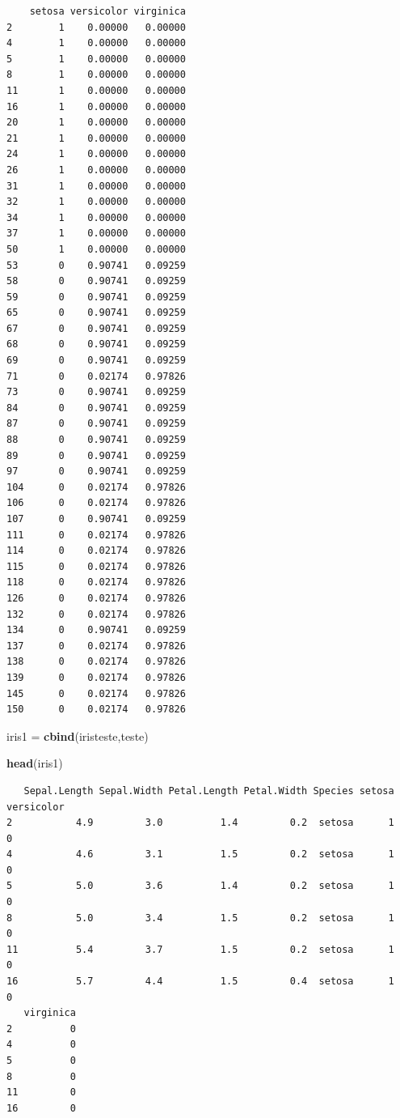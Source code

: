 \documentclass[12pt,brazil,oneside]{book}
\newenvironment{Shaded}{\begin{snugshade}}{\end{snugshade}}
\newcommand{\KeywordTok}[1]{\textcolor[rgb]{0.13,0.29,0.53}{\textbf{#1}}}
\newcommand{\NormalTok}[1]{#1}
\newcommand{\StringTok}[1]{\textcolor[rgb]{0.31,0.60,0.02}{#1}}
\begin{document}
\begin{verbatim}
    setosa versicolor virginica
2        1    0.00000   0.00000
4        1    0.00000   0.00000
5        1    0.00000   0.00000
8        1    0.00000   0.00000
11       1    0.00000   0.00000
16       1    0.00000   0.00000
20       1    0.00000   0.00000
21       1    0.00000   0.00000
24       1    0.00000   0.00000
26       1    0.00000   0.00000
31       1    0.00000   0.00000
32       1    0.00000   0.00000
34       1    0.00000   0.00000
37       1    0.00000   0.00000
50       1    0.00000   0.00000
53       0    0.90741   0.09259
58       0    0.90741   0.09259
59       0    0.90741   0.09259
65       0    0.90741   0.09259
67       0    0.90741   0.09259
68       0    0.90741   0.09259
69       0    0.90741   0.09259
71       0    0.02174   0.97826
73       0    0.90741   0.09259
84       0    0.90741   0.09259
87       0    0.90741   0.09259
88       0    0.90741   0.09259
89       0    0.90741   0.09259
97       0    0.90741   0.09259
104      0    0.02174   0.97826
106      0    0.02174   0.97826
107      0    0.90741   0.09259
111      0    0.02174   0.97826
114      0    0.02174   0.97826
115      0    0.02174   0.97826
118      0    0.02174   0.97826
126      0    0.02174   0.97826
132      0    0.02174   0.97826
134      0    0.90741   0.09259
137      0    0.02174   0.97826
138      0    0.02174   0.97826
139      0    0.02174   0.97826
145      0    0.02174   0.97826
150      0    0.02174   0.97826
\end{verbatim}

\begin{Shaded}
\begin{Highlighting}[]
\NormalTok{iris1 =}\StringTok{ }\KeywordTok{cbind}\NormalTok{(iristeste,teste)}

\KeywordTok{head}\NormalTok{(iris1)}
\end{Highlighting}
\end{Shaded}

\begin{verbatim}
   Sepal.Length Sepal.Width Petal.Length Petal.Width Species setosa versicolor
2           4.9         3.0          1.4         0.2  setosa      1          0
4           4.6         3.1          1.5         0.2  setosa      1          0
5           5.0         3.6          1.4         0.2  setosa      1          0
8           5.0         3.4          1.5         0.2  setosa      1          0
11          5.4         3.7          1.5         0.2  setosa      1          0
16          5.7         4.4          1.5         0.4  setosa      1          0
   virginica
2          0
4          0
5          0
8          0
11         0
16         0
\end{verbatim}
\end{document}
